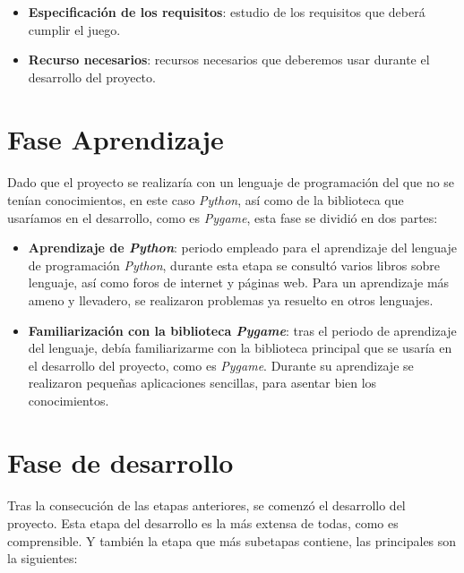 \begin{itemize}
    \item \textbf{Especificación de los requisitos}: estudio de los requisitos que deberá cumplir el juego.
    
    \item \textbf{Recurso necesarios}: recursos necesarios que deberemos usar durante el desarrollo del proyecto.
\end{itemize}

\section{Fase Aprendizaje}

\paragraph{}
Dado que el proyecto se realizaría con un lenguaje de programación del que no se tenían conocimientos, en este caso \emph{Python}, 
así como de la biblioteca que usaríamos en el desarrollo, como es \emph{Pygame}, esta fase se dividió en dos partes:

\begin{itemize}
    \item \textbf{Aprendizaje de \emph{Python}}: periodo empleado para el aprendizaje del lenguaje de programación \emph{Python},
    durante esta etapa se consultó varios libros sobre lenguaje, así como foros de internet y páginas web. Para un aprendizaje más
    ameno y llevadero, se realizaron problemas ya resuelto en otros lenguajes.
    
    \item \textbf{Familiarización con la biblioteca \emph{Pygame}}: tras el periodo de aprendizaje del lenguaje, debía familiarizarme
    con la biblioteca principal que se usaría en el desarrollo del proyecto, como es \emph{Pygame}. Durante su
    aprendizaje se realizaron pequeñas aplicaciones sencillas, para asentar
    bien los conocimientos.
\end{itemize}

\section{Fase de desarrollo}

\paragraph{}
Tras la consecución de las etapas anteriores, se comenzó el desarrollo del proyecto. Esta etapa del desarrollo es la más extensa de 
todas, como es comprensible. Y también la etapa que más subetapas contiene, las principales son la siguientes:

